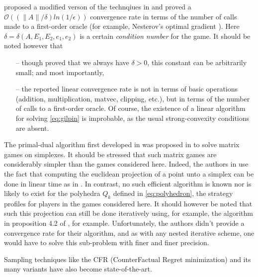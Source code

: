\documentclass[12pt]{article}
\begin{document}
\cite{gilpinfirst} proposed a modified verson of the technqiues in \cite{hoda2010smoothing} and  proved a $\mathcal{O}\left(\left(\|A\| / \delta\right) ln\left(1 / \epsilon\right)\right)$ convergence rate in terms of the number of calls made to a first-order oracle (for example, Nesterov's optimal gradient \cite{nesterov1983}). Here $\delta = \delta(A, E_1, E_2, e_1, e_2)$ is a certain \textit{condition number} for the game.
It should be noted however that
\begin{itemize}
\item[--] though \cite{gilpinfirst} proved that we always have $\delta > 0$, this constant can be arbitrarily small; and most importantly,
\item[--] the reported linear convergence rate is not in terms of basic operations (addition, multiplication, matvec, clipping, etc.), but in terms of the number of calls to a first-order oracle. Of course, the existence of a linear algorithm for solving \eqref{eq:gilpin} is improbable, as the usual strong-convexity conditions are absent.
\end{itemize}


The primal-dual algorithm first developed in \cite{chambolle2010} was proposed \cite{chambolle2014ergodic} in to solve matrix games on simplexes. It should be stressed that such matrix games are considerably simpler than the games considered here. Indeed, the authors in \cite{chambolle2014ergodic} use the fact that computing the euclidean projection of a point unto a simplex can be done in linear time as in \cite{duchi2008efficient}. In contrast, no such efficient algorithm is known nor is likely to exist for the polyhedra $Q_k$ defined in \eqref{eq:polyhedron}, the strategy profiles for players in the games considered here. It should however be noted that such this projection can still be done iteratively using, for example, the algorithm in proposition 4.2 of \cite{combettes2010dualization}, for example. Unfortunately, the authors didn't provide a convergence rate for their algorithm, and as with any nested iterative scheme, one would have to solve this sub-problem with finer and finer precision.

Sampling techniques like the CFR (CounterFactual Regret minimization) and its many variants \cite{MartinZinkevichNIPS2007, lanctot2009monte, Bowling09012015} have also become state-of-the-art.
\end{document}

